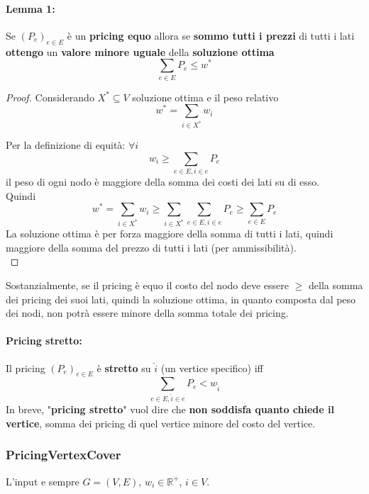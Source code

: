 \documentclass[11pt]{article}
\begin{document}
	\newpage
	
	\paragraph{Lemma 1:} Se $(P_e)_{e \in E}$ è un \textbf{pricing equo} allora se \textbf{sommo tutti i prezzi} di tutti i lati \textbf{ottengo} un \textbf{valore minore uguale} della \textbf{soluzione ottima}
	$$ \sum_{e \in E} P_e \leq w^\ast $$
	
	\begin{proof}
		Considerando $X^\ast \subseteq V$ soluzione ottima e il peso relativo
		$$ w^\ast = \sum_{i \in X^\ast} w_i $$
		
		Per la definizione di equità: $\forall i$ 
		$$ w_i \geq \sum_{e \in E, i \in e} P_e $$
		il peso di ogni nodo è maggiore della somma dei costi dei lati su di esso.\\
		
		Quindi 
		$$ w^\ast = \sum_{i \in X^\ast} w_i \geq \sum_{i \in X^\ast} \sum_{e \in E, i \in e} P_e \geq \sum_{e \in E} P_e $$
		La soluzione ottima è per forza maggiore della somma di tutti i lati, quindi maggiore della somma del prezzo di tutti i lati (per ammissibilità).\\
	\end{proof}
	
	Sostanzialmente,  se il pricing è equo il costo del nodo deve essere $\geq$ della somma dei pricing dei suoi lati, quindi la soluzione ottima, in quanto composta dal peso dei nodi, non potrà essere minore della somma totale dei pricing.\\
	
	\paragraph{Pricing stretto:} Il pricing $(P_e)_{e \in E}$ è \textbf{stretto} su $\hat{i}$ (un vertice specifico) iff
	$$ \sum_{e \in E, \hat{i} \in e} P_e < w_{\hat{i}} $$
	In breve, "\textbf{pricing stretto}" vuol dire che \textbf{non soddisfa quanto chiede il vertice}, somma dei pricing di quel vertice minore del costo del vertice.\\
	
	\newpage
	
	\subsubsection{PricingVertexCover}
	L'input e sempre $G = (V,E)$, $w_i \in \mathbb{R}^+$, $i \in V$.
	
\end{document}
